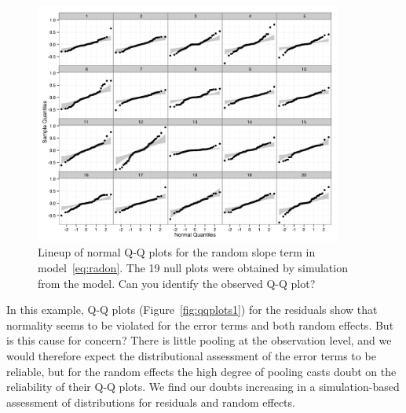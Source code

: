 \documentclass{article} %
\begin{document}
\begin{figure}[htb]
	\centering
	\includegraphics[width=0.9\textwidth]{test.jpeg}%
	\caption{\label{fig:lineup} Lineup of normal Q-Q plots for the random slope term in model~\eqref{eq:radon}. The 19 null plots were obtained by simulation from the model. Can you identify the observed Q-Q plot?}
\end{figure}

In this example, %
Q-Q plots (Figure~\ref{fig:qqplots1}) for the residuals show that normality 
seems to be violated 
for the error terms and both random effects. But is this cause for concern?
There is little pooling at the observation level, and we would therefore expect the distributional assessment of the error terms to be reliable, but  for the random effects the high degree of pooling  casts doubt on the reliability of their Q-Q plots. 
We find our doubts increasing in a simulation-based assessment of distributions for residuals and random effects.
\end{document}
